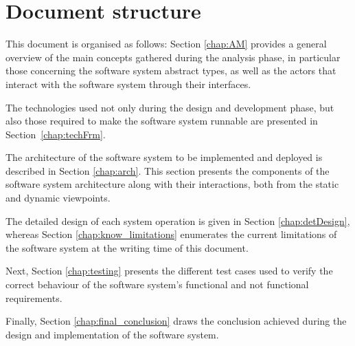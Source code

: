   
\section{Document structure} 
This document is organised as follows: Section \ref{chap:AM} provides a general
overview of the main concepts gathered during the analysis phase, in particular those concerning the software system abstract
types, as well as the actors that interact with the
software system through their interfaces. 

The technologies used not only during the design and development phase, but 
also those required to make the software system runnable are presented in
Section~\ref{chap:techFrm}.

The architecture of the software system to be implemented and deployed is
described in Section \ref{chap:arch}. This section presents the components of
the software system architecture along with their interactions, both from the static and dynamic viewpoints.

The detailed design of each \gls{system operation} is given in Section
\ref{chap:detDesign}, whereas Section \ref{chap:know_limitations} enumerates the
current limitations of the software system at the writing time of this document.

Next, Section \ref{chap:testing} presents the different test cases used to
verify the correct behaviour of the software system's functional and not functional requirements.

Finally, Section \ref{chap:final_conclusion} draws the
conclusion achieved during the design and implementation of the software system.
 
 